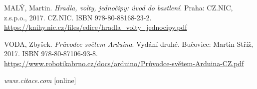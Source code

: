 \begin{thebibliography}{9} \label{literatura}
	
	 MALÝ, Martin. \textit{Hradla, volty, jednočipy: úvod do bastlení}. Praha: CZ.NIC, z.s.p.o., 2017. CZ.NIC. ISBN 978-80-88168-23-2. \\
	\url{https://knihy.nic.cz/files/edice/hradla_volty_jednocipy.pdf}

	
	 VODA, Zbyšek. \textit{Průvodce světem Arduina}. Vydání druhé. Bučovice: Martin Stříž, 2017. ISBN 978-80-87106-93-8. \\
	\url{https://www.robotikabrno.cz/docs/arduino/Průvodce-světem-Arduina-CZ.pdf}

	 \textit{www.citace.com}  [online]
	
\end{thebibliography} %



